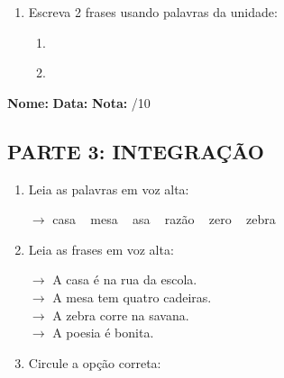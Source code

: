 \begin{exercicio}
\begin{enumerate}[resume]
  \item Escreva 2 frases usando palavras da unidade:
  \begin{enumerate}[label=\alph*)]
    \item \underline{\hspace{8cm}}
    \item \underline{\hspace{8cm}}
  \end{enumerate}

\end{enumerate}

\end{exercicio}



\begin{exercicio}

\noindent\textbf{Nome:} \underline{\hspace{3.2cm}} \quad \textbf{Data:} \underline{\hspace{1.6cm}} \quad \textbf{Nota:} \underline{\hspace{0.9cm}}/10


\subsection*{PARTE 3: INTEGRAÇÃO}

\begin{enumerate}[resume]

  \item Leia as palavras em voz alta:
  \begin{center}
  $\rightarrow$ casa ~ mesa ~ asa ~ razão ~ zero ~ zebra
  \end{center}

  \item Leia as frases em voz alta:
  \begin{center}
  $\rightarrow$ A casa é na rua da escola.\\
  $\rightarrow$ A mesa tem quatro cadeiras.\\
  $\rightarrow$ A zebra corre na savana.\\
  $\rightarrow$ A poesia é bonita.\\
  \end{center}

  \item Circule a opção correta:
  \begin{enumerate}[label=(\alph*)]


\end{enumerate}
\end{enumerate}
\end{exercicio}
